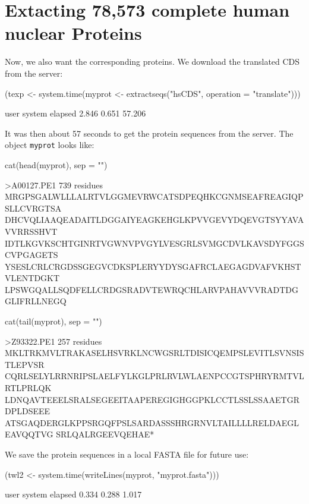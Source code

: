 \documentclass{article}
\begin{document}
\section{Extacting 78,573 complete human nuclear Proteins}

Now, we also want the corresponding proteins. We download the translated 
CDS from the server:

\begin{Schunk}
\begin{Sinput}
 (texp <- system.time(myprot <- extractseqs("hsCDS", operation = "translate")))
\end{Sinput}
\begin{Soutput}
   user  system elapsed 
  2.846   0.651  57.206 
\end{Soutput}
\end{Schunk}

It was then about 57 seconds
to get the protein sequences from the server. The object \texttt{myprot} looks
like:

\begin{Schunk}
\begin{Sinput}
 cat(head(myprot), sep = "\n")
\end{Sinput}
\begin{Soutput}
>A00127.PE1              739 residues
MRGPSGALWLLLALRTVLGGMEVRWCATSDPEQHKCGNMSEAFREAGIQPSLLCVRGTSA
DHCVQLIAAQEADAITLDGGAIYEAGKEHGLKPVVGEVYDQEVGTSYYAVAVVRRSSHVT
IDTLKGVKSCHTGINRTVGWNVPVGYLVESGRLSVMGCDVLKAVSDYFGGSCVPGAGETS
YSESLCRLCRGDSSGEGVCDKSPLERYYDYSGAFRCLAEGAGDVAFVKHSTVLENTDGKT
LPSWGQALLSQDFELLCRDGSRADVTEWRQCHLARVPAHAVVVRADTDGGLIFRLLNEGQ
\end{Soutput}
\begin{Sinput}
 cat(tail(myprot), sep = "\n")
\end{Sinput}
\begin{Soutput}
>Z93322.PE1              257 residues
MKLTRKMVLTRAKASELHSVRKLNCWGSRLTDISICQEMPSLEVITLSVNSISTLEPVSR
CQRLSELYLRRNRIPSLAELFYLKGLPRLRVLWLAENPCCGTSPHRYRMTVLRTLPRLQK
LDNQAVTEEELSRALSEGEEITAAPEREGIGHGGPKLCCTLSSLSSAAETGRDPLDSEEE
ATSGAQDERGLKPPSRGQFPSLSARDASSSHRGRNVLTAILLLLRELDAEGLEAVQQTVG
SRLQALRGEEVQEHAE*
\end{Soutput}
\end{Schunk}

We save the protein sequences in a local FASTA file for future use:

\begin{Schunk}
\begin{Sinput}
 (twl2 <- system.time(writeLines(myprot, "myprot.fasta")))
\end{Sinput}
\begin{Soutput}
   user  system elapsed 
  0.334   0.288   1.017 
\end{Soutput}
\end{Schunk}
\end{document}
